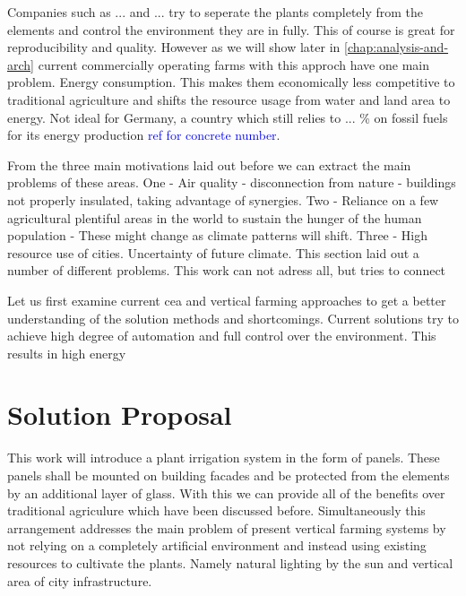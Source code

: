 Companies such as ... and ... try to seperate the plants completely from the elements and control the environment they are in fully.
This of course is great for reproducibility and quality.
However as we will show later in \ref{chap:analysis-and-arch} current commercially operating farms with this approch have one main problem.
Energy consumption.
This makes them economically less competitive to traditional agriculture and shifts the resource usage from water and land area to energy.
Not ideal for Germany, a country which still relies to ... \% on fossil fuels for its energy production \textcolor{blue}{ref for concrete number}.

From the three main motivations laid out before we can extract the main problems of these areas.
One - Air quality - disconnection from nature - buildings not properly insulated, taking advantage of synergies. 
Two - Reliance on a few agricultural plentiful areas in the world to sustain the hunger of the human population - These might change as climate patterns will shift.
Three - 
High resource use of cities.
Uncertainty of future climate.
This section laid out a number of different problems. This work can not adress all, but tries to connect 

Let us first examine current \ac{cea} and vertical farming approaches to get a better understanding of the solution methods and shortcomings.
Current solutions try to achieve high degree of automation and full control over the environment.
This results in high energy



\section{Solution Proposal}
This work will introduce a plant irrigation system in the form of panels.
These panels shall be mounted on building facades and be protected from the elements by an additional layer of glass.
With this we can provide all of the benefits over traditional agriculure which have been discussed before.
Simultaneously this arrangement addresses the main problem of present vertical farming systems by not relying on a completely artificial environment and instead using existing resources to cultivate the plants.
Namely natural lighting by the sun and vertical area of city infrastructure.

